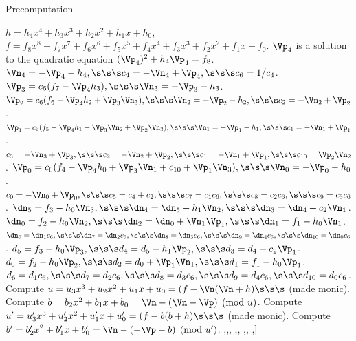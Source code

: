 \begin{algorithm}[htbp]
\caption{Precomputation\label{alg:g3explSPLITpre}}
\begin{algorithmic} [1]
\Require $h = h_4x^4 + h_3x^3 + h_2x^2 + h_1x + h_0$,
\Statex \hspace{23pt}$f = f_8x^8 + f_7x^7 + f_6x^6 + f_5x^5 + f_4x^4 + f_3x^3 + f_2x^2 + f_1x + f_0$.
\algrule
\State $\Vp_4$ is a solution to the quadratic equation $(\Vp_4)^2  + h_4\Vp_4 = f_8$.
\State $\Vn_4 = -\Vp_4 - h_4, \s\s\s c_4 = -\Vn_4 + \Vp_4, \s\s\s c_6 =1/c_4$.
\State $\Vp_3 = c_6(f_7 - \Vp_4h_3), \s\s\s \Vn_3 = -\Vp_3 - h_3$.
\State $\Vp_2 = c_6(f_6 - \Vp_4h_2 + \Vp_3\Vn_3), \s\s\s \Vn_2 = -\Vp_2 - h_2, \s\s\s c_2 = -\Vn_2 + \Vp_2$.
\State $\Vp_1 = c_6(f_5 - \Vp_4h_1 + \Vp_3\Vn_2 + \Vp_2\Vn_3), \s\s\s \Vn_1 = -\Vp_1 - h_1, \s\s\s c_1 = -\Vn_1 + \Vp_1$.
\State $c_3 = -\Vn_3 + \Vp_3, \s\s\s c_2 = -\Vn_2 + \Vp_2, \s\s\s c_1 = -\Vn_1 + \Vp_1, \s\s\s c_{10} = \Vp_2\Vn_2$.
\State $\Vp_0 = c_6(f_4 - \Vp_4h_0 + \Vp_3\Vn_1 + c_{10} + \Vp_1\Vn_3), \s\s\s \Vn_0 = -\Vp_0 - h_0$.
\State $c_0 = -\Vn_0 + \Vp_0, \s\s\s c_5 = c_4 + c_2, \s\s\s c_7 = c_1c_6, \s\s\s c_8 = c_2c_6, \s\s\s c_9 = c_3c_6$.
\State $\dn_5 = f_3 - h_0\Vn_3, \s\s\s \dn_4 = \dn_5 - h_1\Vn_2, \s\s\s \dn_3 = \dn_4 + c_2\Vn_1$.
\State $\dn_0 = f_2 - h_0\Vn_2, \s\s\s \dn_2 = \dn_0 + \Vn_1\Vp_1, \s\s\s \dn_1 = f_1 - h_0\Vn_1$.
\State $\dn_6 = \dn_1c_6, \s\s\s \dn_7 = \dn_2c_6, \s\s\s \dn_8 = \dn_3c_6, \s\s\s \dn_9 = \dn_4c_6, \s\s\s \dn_{10} = \dn_0c_6$.
\State $d_5 = f_3 - h_0\Vp_3, \s\s\s d_4 = d_5 - h_1\Vp_2, \s\s\s d_3 = d_4 + c_2\Vp_1$.
\State $d_0 = f_2 - h_0\Vp_2, \s\s\s d_2 = d_0 + \Vp_1\Vn_1, \s\s\s d_1 = f_1 - h_0\Vp_1$.
\State $d_6 = d_1c_6, \s\s\s d_7 = d_2c_6, \s\s\s d_8 = d_3c_6, \s\s\s d_9 = d_4c_6, \s\s\s d_{10} = d_0c_6$.
\State Compute $u = u_3x^3 + u_2x^2 + u_1x + u_0 = (f - \Vn(\Vn +  h) \s\s\s$ (made monic).
\State Compute $b = b_2x^2 + b_1x + b_0 = \Vn - (\Vn - \Vp) \pmod{u}$.
\State Compute $u' = u'_3x^3 + u'_2x^2 + u'_1x + u'_0 = (f - b(b +  h) \s\s\s$ (made monic).
\State Compute $b' = b'_2x^2 + b'_1x + b'_0 = \Vn - (-\Vp - b) \pmod{u'}$.
\State \Return [[$f_0,f_1,f_2,f_3,f_4,f_5,f_6,f_7,f_8$],\s[$h_0,h_1,h_2,h_3,h_4$],\s[$\Vp_0,\Vp_1,\Vp_2,\Vp_3,\Vp_4$],
\Statex \hspace{37pt} \s[$\Vn_0,\Vn_1,\Vn_2,\Vn_3,\Vn_4$],\s[$c_0,c_1,c_2,c_3,c_4,c_5,c_6,c_7,c_8,c_9,c_{10}$], 
\Statex \hspace{37pt} \s[$d_0,d_1,d_2,d_3,d_4,d_5,d_6,d_7,d_8,d_9,d_{10}$],\s[$\dn_0,\dn_1,\dn_2,\dn_3,\dn_4,\dn_5,\dn_6,\dn_7,\dn_8,\dn_9,\dn_{10}$],
\Statex \hspace{37pt} \s[$u_0,u_1,u_2,u_3,n,b_0,b_1,b_2$],\s[$u'_0,u'_1,u'_2,u'_3,n',b'_0,b'_1,b'_2$]]
\end{algorithmic}
\end{algorithm}

